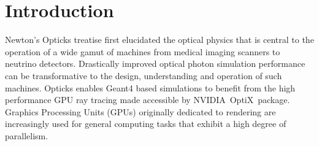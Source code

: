 \documentclass[a4paper]{jpconf}
\begin{document}
%
%
%
%
%
%
%
%

\section{Introduction}

Newton's Opticks treatise\cite{newton} first elucidated the optical physics 
that is central to the operation of a wide gamut of machines from medical imaging 
scanners to neutrino detectors. Drastically improved optical photon simulation 
performance can be transformative to the design, understanding 
and operation of such machines. Opticks\cite{opticksURL} enables Geant4\cite{g4A}\cite{g4B}\cite{g4C}
based simulations to benefit from the high performance GPU ray tracing made accessible
by NVIDIA\textregistered\ OptiX\texttrademark\ package\cite{optixPaper}\cite{optixSite}.
Graphics Processing Units (GPUs) originally dedicated to rendering are increasingly
used for general computing tasks that exhibit a high degree of parallelism.
\end{document}
